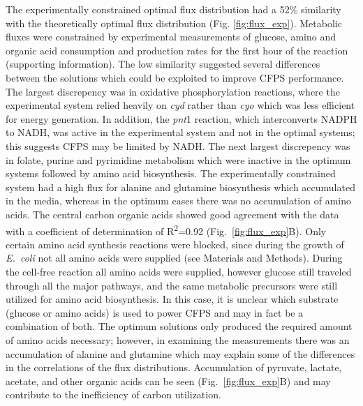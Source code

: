 \documentclass[journal=asbcd6,manuscript=article]{achemso}
\begin{document}
The experimentally constrained optimal flux distribution had a 52\% similarity with the theoretically optimal flux distribution (Fig. \ref{fig:flux_exp}).
Metabolic fluxes were constrained by experimental measurements of glucose, amino and organic acid consumption and production rates for the first hour of the reaction (supporting information). The low similarity suggested several differences between the solutions which could be exploited to improve CFPS performance.
The largest discrepency was in oxidative phosphorylation reactions, where the experimental system relied heavily on \textit{cyd} rather than \textit{cyo} which was less efficient for energy generation.
In addition, the \textit{pnt}1 reaction, which interconverts NADPH to NADH, was active in the experimental system and not in the optimal systems; this suggests CFPS may be limited by NADH.
The next largest discrepency was in folate, purine and pyrimidine metabolism which were inactive in the optimum systems followed by amino acid biosynthesis. 
The experimentally constrained system had a high flux for alanine and glutamine biosynthesis which accumulated in the media, whereas in the optimum cases there was no accumulation of amino acids. 
The central carbon organic acids showed good agreement with the data with a coefficient of determination of R\textsuperscript{2}=0.92 (Fig.~\ref{fig:flux_exp}B).
Only certain amino acid synthesis reactions were blocked, since during the growth of \emph{E.~coli} not all amino acids were supplied (see Materials and Methods).
During the cell-free reaction all amino acids were supplied, however glucose still traveled through all the major pathways, and the same metabolic precursors were still utilized for amino acid biosynthesis.
In this case, it is unclear which substrate (glucose or amino acids) is used to power CFPS and may in fact be a combination of both.
The optimum solutions only produced the required amount of amino acids necessary; however, in examining the measurements there was an accumulation of alanine and glutamine which may explain some of the differences in the correlations of the flux distributions.
Accumulation of pyruvate, lactate, acetate, and other organic acids can be seen (Fig.~\ref{fig:flux_exp}B) and may contribute to the inefficiency of carbon utilization.

\end{document}
